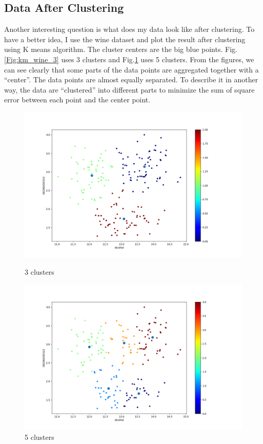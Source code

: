 \documentclass[11pt]{article}
\begin{document}
\subsection{Data After Clustering}
Another interesting question is what does my data look like after clustering. To have a better idea, I use the wine dataset and plot the result after clustering using K means algorithm. The cluster centers are the big blue points. Fig.\ref{Fig:km_wine_3} uses 3 clusters and Fig.\ref{Fig:km_wine_5} uses 5 clusters. From the figures, we can see clearly that some parts of the data points are aggregated together with a ``center''. The data points are almost equally separated. To describe it in another way, the data are ``clustered'' into different parts to minimize the sum of square error between each point and the center point.
\begin{figure}[!htb]
   \begin{minipage}{0.5\textwidth}
     \centering
     \includegraphics[width=1.2\linewidth]{../figures/km_wine_3.png}
     \caption{3 clusters}\label{Fig:km_wine_3}
   \end{minipage}\hfill
   \begin{minipage}{0.5\textwidth}
     \centering
     \includegraphics[width=1.2\linewidth]{../figures/km_wine_5.png}
     \caption{5 clusters}\label{Fig:km_wine_5}
   \end{minipage}
\end{figure}
\end{document}
